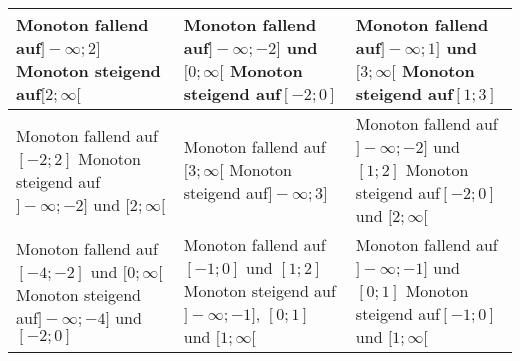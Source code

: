 \begin{Answer}[ref=monotonieA1]

	\begin{tabular}{p{}|p{}|p{}}
		\hline
		Monoton fallend auf\newline \(]-\infty;2]\)\newline
		Monoton steigend auf\newline \([2;\infty[\)
		&
		Monoton fallend auf\newline \(]-\infty;-2]\) und \([0;\infty[\)\newline
		Monoton steigend auf\newline \([-2;0]\)
		&
		Monoton fallend auf\newline \(]-\infty;1]\) und \([3;\infty[\)\newline
		Monoton steigend auf\newline \([1;3]\)
		\\
		\hline
		Monoton fallend auf\newline \([-2;2]\)\newline
		Monoton steigend auf\newline \(]-\infty;-2]\) und \([2;\infty[\)
		&
		Monoton fallend auf\newline \([3;\infty[\)\newline
		Monoton steigend auf\newline \(]-\infty;3]\)
		&
		Monoton fallend auf\newline \(]-\infty;-2]\) und \([1;2]\)\newline
		Monoton steigend auf\newline \([-2;0]\) und \([2;\infty[\)
		\\
		\hline
		Monoton fallend auf\newline \([-4;-2]\) und \([0;\infty[\)\newline
		Monoton steigend auf\newline \(]-\infty;-4]\) und \([-2;0]\)
		&
		Monoton fallend auf\newline \([-1;0]\) und \([1;2]\)\newline
		Monoton steigend auf\newline \(]-\infty;-1]\), \([0;1]\) und \([1;\infty[\)
		&
		Monoton fallend auf\newline \(]-\infty;-1]\) und \([0;1]\)\newline
		Monoton steigend auf\newline \([-1;0]\) und \([1;\infty[\)
		\\
		\hline
	\end{tabular}
\end{Answer}
